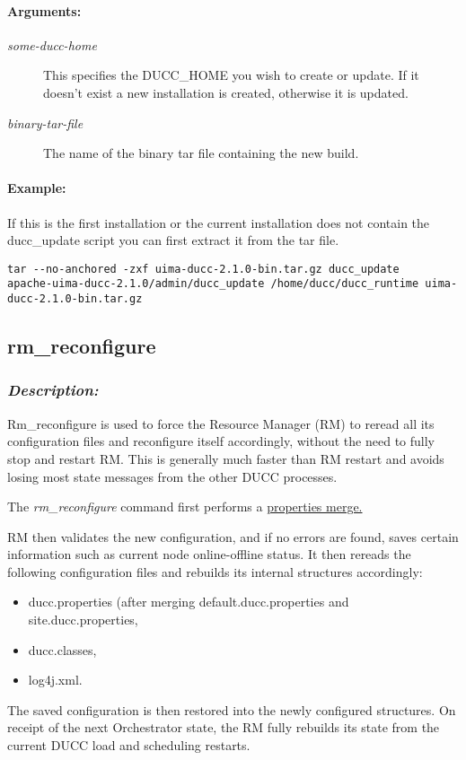    \paragraph{Arguments:}
    \begin{description}
        \item[{\em some-ducc-home}] 
          This specifies the DUCC\_HOME you wish to create or update.  If it doesn't exist a new
          installation is created, otherwise it is updated.
        \item[{\em binary-tar-file}]
          The name of the binary tar file containing the new build.
     \end{description}

    \paragraph{Example:}
        If this is the first installation or the current installation does not contain the
        ducc\_update script you can first extract it from the tar file. 
\begin{verbatim}
tar --no-anchored -zxf uima-ducc-2.1.0-bin.tar.gz ducc_update
apache-uima-ducc-2.1.0/admin/ducc_update /home/ducc/ducc_runtime uima-ducc-2.1.0-bin.tar.gz 
\end{verbatim}

\subsection{rm\_reconfigure}
\label{subsec:admin.rm-reconfigure}

    \subsubsection{{\em Description:}}
    Rm\_reconfigure is used to force the Resource Manager (RM) to reread all its configuration
    files and reconfigure itself accordingly, without the need to fully stop and restart RM.
    This is generally much faster than RM restart and avoids losing most state messages from
    the other DUCC processes.
    
    The {\em rm\_reconfigure} command first performs a 
    \hyperref[sec:admin.properties-merge]{properties merge.}

    RM then validates the new
    configuration, and if no errors are found, saves certain information such as current node
    online-offline status.  It then rereads the following configuration files and rebuilds its
    internal structures accordingly:
    \begin{itemize}
      \item ducc.properties (after merging default.ducc.properties and site.ducc.properties,
      \item ducc.classes,
      \item log4j.xml.
    \end{itemize}
    The saved configuration is then restored into the newly configured structures.
    On receipt of the next Orchestrator state, the RM fully rebuilds its state from the current
    DUCC load and scheduling restarts.

